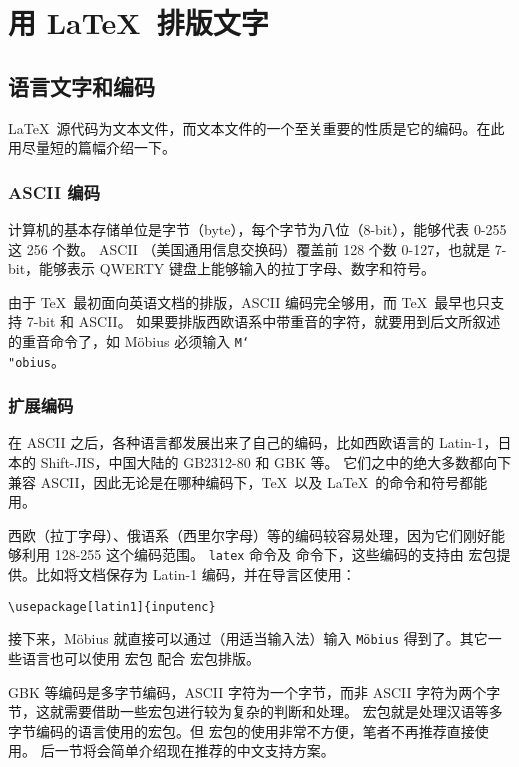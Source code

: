 \chapter{用 \LaTeX\ 排版文字}

\section{语言文字和编码}\label{sec:encoding}

\LaTeX\ 源代码为文本文件，而文本文件的一个至关重要的性质是它的编码。在此用尽量短的篇幅介绍一下。

\subsection{ASCII 编码}\label{subsec:ascii}

计算机的基本存储单位是字节（byte），每个字节为八位（8-bit），能够代表 0-255 这 256 个数。
ASCII （美国通用信息交换码）覆盖前 128 个数 0-127，也就是 7-bit，能够表示 QWERTY 键盘上能够输入的拉丁字母、数字和符号。

由于 \TeX\ 最初面向英语文档的排版，ASCII 编码完全够用，而 \TeX\ 最早也只支持 7-bit 和 ASCII。
如果要排版西欧语系中带重音的字符，就要用到后文所叙述的重音命令了，如 M\"obius 必须输入 \texttt{M\char`\\"obius}。

\subsection{扩展编码}\label{subsec:ext-encoding}

在 ASCII 之后，各种语言都发展出来了自己的编码，比如西欧语言的 Latin-1，日本的 Shift-JIS，中国大陆的 GB2312-80 和 GBK 等。
它们之中的绝大多数都向下兼容 ASCII，因此无论是在哪种编码下，\TeX\ 以及 \LaTeX\ 的命令和符号都能用。

西欧（拉丁字母）、俄语系（西里尔字母）等的编码较容易处理，因为它们刚好能够利用 128-255 这个编码范围。
\texttt{latex} 命令及  命令下，这些编码的支持由  宏包提供。比如将文档保存为 Latin-1 编码，并在导言区使用：
\begin{verbatim}
\usepackage[latin1]{inputenc}
\end{verbatim}

接下来，M\"obius 就直接可以通过（用适当输入法）输入 \texttt{M\"obius} 得到了。其它一些语言也可以使用  宏包
配合  宏包排版。

GBK 等编码是多字节编码，ASCII 字符为一个字节，而非 ASCII 字符为两个字节，这就需要借助一些宏包进行较为复杂的判断和处理。
 宏包就是处理汉语等多字节编码的语言使用的宏包。但  宏包的使用非常不方便，笔者不再推荐直接使用。
后一节将会简单介绍现在推荐的中文支持方案。

